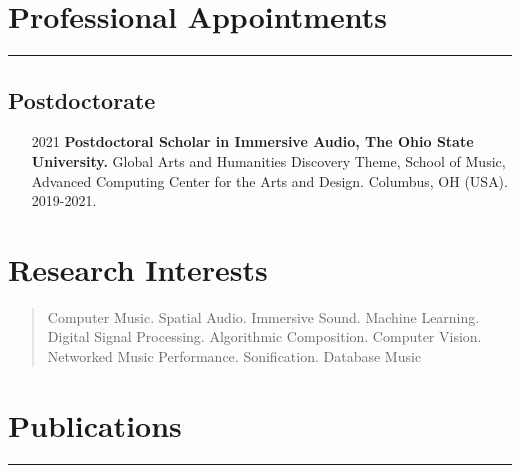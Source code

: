 \documentclass[12pt]{article}%
\begin{document}
%
\section{Professional Appointments}%
\label{sec:ProfessionalAppointments}%
\hrule%
\subsection{Postdoctorate}%
\begin{itemize}[align=parleft,leftmargin=2.25cm,labelwidth=2cm]
\item[2021]
\textbf{Postdoctoral Scholar in Immersive Audio, The Ohio State University.}
Global Arts and Humanities Discovery Theme, School of Music, Advanced Computing Center for the Arts and Design. 
Columbus, OH (USA). 
2019{-}2021.
\end{itemize}%
\section{Research Interests}%
\label{sec:ResearchInterests}%
\begin{quote}
Computer Music. Spatial Audio. Immersive Sound. Machine Learning. Digital Signal Processing. Algorithmic Composition. Computer Vision. Networked Music Performance. Sonification. Database Music
\end{quote}

%
\pagebreak

%
\section{Publications}%
\label{sec:Publications}%
\hrule%
\end{document}

